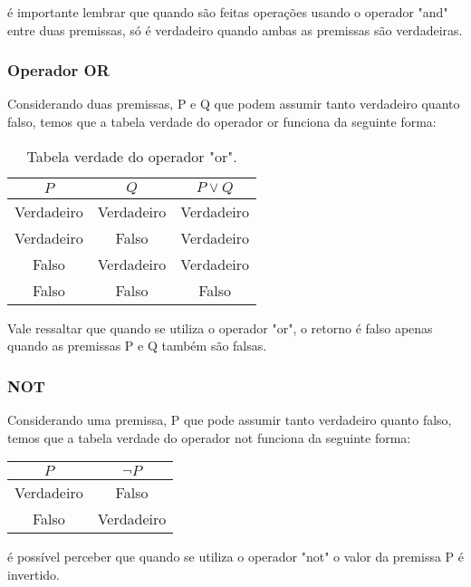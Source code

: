 	\'{e} importante lembrar que quando s\~{a}o feitas opera\c{c}\~{o}es usando o operador "and" entre duas premissas, só \'{e} verdadeiro quando ambas as premissas s\~{a}o verdadeiras.
	
	\subsubsection{Operador OR}
	Considerando duas premissas, P e Q que podem assumir tanto verdadeiro quanto falso, temos que a tabela verdade do operador or funciona da seguinte forma:
	
	\begin{table}[h!]
	\centering
		\begin{tabular}{|c|c||c|}
			\hline
			$P$ & $Q$ & $P \lor Q$ \\
			\hline
			\hline
			Verdadeiro & Verdadeiro & Verdadeiro \\
			\hline
			Verdadeiro & Falso & Verdadeiro \\
			\hline
			Falso & Verdadeiro & Verdadeiro \\
			\hline
			Falso & Falso & Falso \\
			\hline
		\end{tabular}
	\caption{Tabela verdade do operador "or".}
	\label{tab:or}
	\end{table}
	
	Vale ressaltar que quando se utiliza o operador "or", o retorno \'{e} falso apenas quando as premissas P e Q tamb\'{e}m s\~{a}o falsas.

	\subsubsection{NOT}
	Considerando uma premissa, P que pode assumir tanto verdadeiro quanto falso, temos que a tabela verdade do operador not funciona da seguinte forma:
	
	\begin{center}
		\begin{tabular}{|c||c|}
			\hline
			$P$ & $\neg P$ \\
			\hline
			\hline
			Verdadeiro & Falso \\
			\hline
			Falso & Verdadeiro \\
			\hline
		\end{tabular}
	\end{center}

	\'{e} poss\'{i}vel perceber que quando se utiliza o operador "not" o valor da premissa P \'{e} invertido.
	
